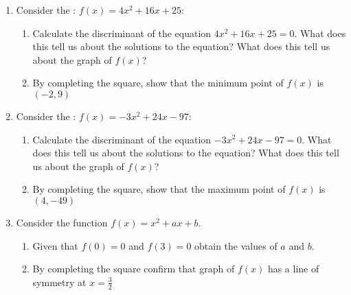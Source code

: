 \begin{enumerate}
\begin{enumerate}
\end{enumerate}

\item 

Consider the : \(f(x)=4x ^ 2 + 16x + 25\):
\begin{enumerate}

\item 

Calculate the discriminant of the  equation \(4x ^ 2 + 16x + 25 =
0\). What does this tell us about the solutions to the equation? What
does this tell us about the graph of \(f(x)\)?

\item 

By completing the square, show that the minimum point of \(f(x)\) is
\(\left(-2, 9\right)\)

\end{enumerate}

\item 

Consider the : \(f(x)=-3x ^ 2 + 24x - 97\):
\begin{enumerate}

\item 

Calculate the discriminant of the  equation \(-3x ^ 2 + 24x - 97 =
0\). What does this tell us about the solutions to the equation? What
does this tell us about the graph of \(f(x)\)?

\item 

By completing the square, show that the maximum point of \(f(x)\) is
\(\left(4, -49\right)\)

\end{enumerate}

\item 

Consider the function \(f(x) = x^ 2 + a x + b\).
\begin{enumerate}

\item 

Given that \(f(0) = 0\) and \(f(3) = 0\) obtain the values of \(a\) and \(b\).

\item 

By completing the square confirm that graph of \(f(x)\) has a line of symmetry at \(x=\frac{3}{2}\)

\end{enumerate}

\end{enumerate}

